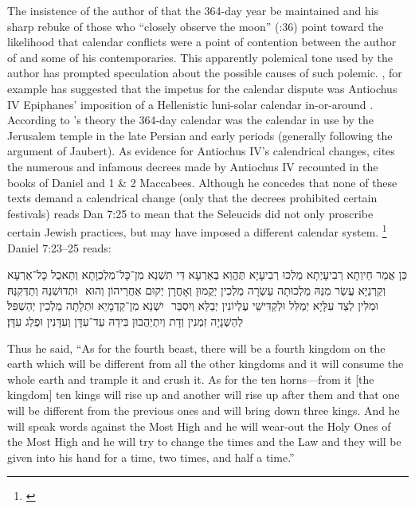 The insistence of the author of \jub that the 364-day year be maintained and his sharp rebuke of those who ``closely observe the moon'' (:36) point toward the likelihood that calendar conflicts were a point of contention between the author of \jub and some of his contemporaries. This apparently polemical tone used by the author has prompted speculation about the possible causes of such polemic. \vanderkam, for example has suggested that the impetus for the calendar dispute was Antiochus IV Epiphanes' imposition of a Hellenistic luni-solar calendar in-or-around . According to \vanderkam's theory the 364-day calendar was the calendar in use by the Jerusalem temple in the late Persian and early \secondtemple periods (generally following the argument of Jaubert). As evidence for Antiochus IV's calendrical changes, \vanderkam cites the numerous and infamous decrees made by Antiochus IV recounted in the books of Daniel and 1 \& 2 Maccabees. Although he concedes that none of these texts demand a calendrical change (only that the decrees prohibited certain festivals) \vanderkam reads Dan 7:25 to mean that the Seleucids did not only proscribe certain Jewish practices, but may have imposed a different calendar system.%
    \footnote{\cite[59--60; 68--69]{vanderkam_jsj1981}}
Daniel 7:23--25 reads:

\begin{aramaictext}
    ‏כֵּן אֲמַר חֵיוְתָא רְבִיעָיְתָא מַלְכוּ רְבִיעָיָא תֶּהֱוֵא בְאַרְעָא דִּי תִשְׁנֵא מִן־כָּל־מַלְכְוָתָא וְתֵאכֻל כָּל־אַרְעָא וּתְדוּשִׁנַּהּ וְתַדְּקִנַּהּ׃ ‎
    ‏ וְקַרְנַיָּא עֲשַׂר מִנַּהּ מַלְכוּתָה עַשְׂרָה מַלְכִין יְקֻמוּן וְאָחֳרָן יְקוּם אַחֲרֵיהוֹן וְהוּא יִשְׁנֵא מִן־קַדְמָיֵא וּתְלָתָה מַלְכִין יְהַשְׁפִּל׃ ‎
    ‏ וּמִלִּין לְצַד עִלָּיָא יְמַלִּל וּלְקַדִּישֵׁי עֶלְיוֹנִין יְבַלֵּא וְיִסְבַּר לְהַשְׁנָיָה זִמְנִין וְדָת וְיִתְיַהֲבוּן בִּידֵהּ עַד־עִדָּן וְעִדָּנִין וּפְלַג עִדָּן׃
\end{aramaictext}

\begin{translation}
    Thus he said, ``As for the fourth beast, there will be a fourth kingdom on the earth which will be different from all the other kingdoms and it will consume the whole earth and trample it and crush it.
    As for the ten horns---from it [the kingdom] ten kings will rise up and another will rise up after them and that one will be different from the previous ones and will bring down three kings.
    And he will speak words against the Most High and he will wear-out the Holy Ones of the Most High and he will try to change the times and the Law and they will be given into his hand for a time, two times, and half a time.''
\end{translation}


